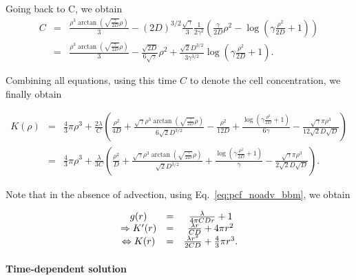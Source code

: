\documentclass[12pt,english]{article}
\begin{document}
Going back to C, we obtain 
\begin{equation}
\begin{array}{ccc}
C & = & \frac{\rho^{3}\arctan(\sqrt{\frac{\gamma}{2D}}\rho)}{3}-\left(2D\right)^{3/2}\frac{\sqrt{\gamma}}{3}\frac{1}{2\gamma^{2}}\left(\frac{\gamma}{2D}\rho^{2}-\log(\gamma\frac{\rho^{2}}{2D}+1)\right)\\
 & = & \frac{\rho^{3}\arctan(\sqrt{\frac{\gamma}{2D}}\rho)}{3}-\frac{\sqrt{2D}}{6\sqrt{\gamma}}\rho^{2}+\frac{\sqrt{2}D^{3/2}}{3\gamma^{3/2}}\log(\gamma\frac{\rho^{2}}{2D}+1).
\end{array}
\end{equation}

Combining all equations, using this time $C$ to denote the cell concentration, we finally obtain

\begin{equation}
\begin{array}{ccc}
K(\rho) & = & \frac{4}{3}\pi\rho^{3}+\frac{2\lambda}{C}\left(\frac{\rho^{2}}{4D}+\frac{\sqrt{\gamma}\rho^{3}\arctan(\sqrt{\frac{\gamma}{2D}}\rho)}{6\sqrt{2}D^{3/2}}-\frac{\rho^{2}}{12D}+\frac{\log\left(\gamma\frac{\rho^{2}}{2D}+1\right)}{6\gamma}-\frac{\sqrt{\gamma}\pi\rho^{3}}{12\sqrt{2}D\sqrt{D}}\right)\\
 & = & \frac{4}{3}\pi\rho^{3}+\frac{\lambda}{3C}\left(\frac{\rho^{2}}{D}+\frac{\sqrt{\gamma}\rho^{3}\arctan(\sqrt{\frac{\gamma}{2D}}\rho)}{\sqrt{2}D^{3/2}}+\frac{\log\left(\gamma\frac{\rho^{2}}{2D}+1\right)}{\gamma}-\frac{\sqrt{\gamma}\pi\rho^{3}}{2\sqrt{2}D\sqrt{D}}\right).
\end{array}\label{eq:K_intra_adv_app}
\end{equation}

Note that in the absence of advection, using Eq.~\ref{eq:pcf_noadv_bbm}, we obtain

\begin{equation}
\begin{array}{ccc}
g(r) & = & \frac{\lambda}{4\pi CDr}+1\\
\Rightarrow K'(r) & = & \frac{\lambda r}{CD}+4\text{\ensuremath{\pi r^{2}}}\\
\Leftrightarrow K(r) & = & \frac{\lambda r^{2}}{2CD}+\frac{4}{3}\pi r^{3}.
\end{array}\label{eq:K_intra_no_adv_steady_app}
\end{equation}


\paragraph{Time-dependent solution}
\end{document}
